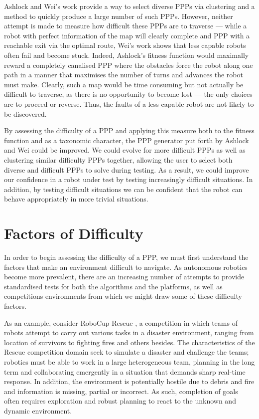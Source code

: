 \documentclass[authoryearcitations]{UoYCSproject}
\begin{document}
Ashlock and Wei's work provide a way to select diverse PPPs via clustering and a method to quickly produce a large number of such PPPs. However, neither attempt is made to measure how difficult these PPPs are to traverse --- while a robot with perfect information of the map will clearly complete and PPP with a reachable exit via the optimal route, Wei's work shows that less capable robots often fail and become stuck. Indeed, Ashlock's fitness function would maximally reward a completely canalised PPP where the obstacles force the robot along one path in a manner that maximises the number of turns and advances the robot must make. Clearly, such a map would be time consuming but not actually be difficult to traverse, as there is no opportunity to become lost --- the only choices are to proceed or reverse. Thus, the faults of a less capable robot are not likely to be discovered. 

By assessing the difficulty of a PPP and applying this measure both to the fitness function and as a taxonomic character, the PPP generator put forth by Ashlock and Wei could be improved. We could evolve for more difficult PPPs as well as clustering similar difficulty PPPs together, allowing the user to select both diverse and difficult PPPs to solve during testing. As a result, we could improve our confidence in a robot under test by testing increasingly difficult situations. In addition, by testing difficult situations we can be confident that the robot can behave appropriately in more trivial situations.


\section{Factors of Difficulty}
\label{sec:lit3}
In order to begin assessing the difficulty of a PPP, we must first understand the factors that make an environment difficult to navigate. As autonomous robotics become more prevalent, there are an increasing number of attempts to provide standardised tests for both the algorithms and the platforms, as well as competitions environments from which we might draw some of these difficulty factors. 

As an example, consider RoboCup Rescue \cite{robocup}, a competition in which teams of robots attempt to carry out various tasks in a disaster environment, ranging from location of survivors to fighting fires and others besides. The characteristics of the Rescue competition domain seek to simulate a disaster and challenge the teams; robotics must be able to work in a large heterogeneous team, planning in the long term and collaborating emergently in a situation that demands sharp real-time response. In addition, the environment is potentially hostile due to debris and fire and information is missing, partial or incorrect. As such, completion of goals often requires exploration and robust planning to react to the unknown and dynamic environment.
\end{document}
